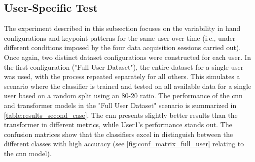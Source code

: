 
\subsection{User-Specific Test}

The experiment described in this subsection focuses on the variability in hand configurations and keypoint patterns for the same user over time (i.e., under different conditions imposed by the four data acquisition sessions carried out). Once again, two distinct dataset configurations were constructed for each user. In the first configuration ("Full User Dataset"), the entire dataset for a single user was used, with the process repeated separately for all others. This simulates a scenario where the classifier is trained and tested on all available data for a single user based on a random split using an 80-20 ratio. The performance of the \acs{cnn} and transformer models in the "Full User Dataset" scenario is summarized in \autoref{table:results_second_case}. The \acs{cnn} presents slightly better results than the transformer in different metrics, while User1's performance stands out. The confusion matrices show that the classifiers excel in distinguish between the different classes with high accuracy (see \autoref{fig:conf_matrix_full_user} relating to the \acs{cnn} model). 

